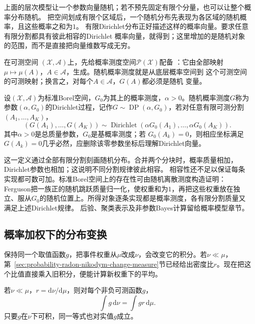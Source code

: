 上面的层次模型让一个参数向量随机；若不预先固定有限个分量，也可以让整个概率分布随机。
把空间划成有限个区域后，一个随机分布先表现为各区域的随机概率，且这些概率之和为$1$。
有限Dirichlet分布正好描述这样的概率向量。要求任意有限分割都具有彼此相容的Dirichlet
概率向量，就得到；这里增加的是随机对象的范围，而不是直接把向量维数写成无穷。
\begin{definition}[随机概率测度]
  \label{def:probability-random-probability-measure}
在可测空间
\((\mathcal X,\mathcal A)\)上，先给概率测度空间\(\mathcal P(\mathcal X)\)配备
：它由全部映射
\(\mu\mapsto\mu(A)\)，\(A\in\mathcal A\)，生成。随机概率测度就是从底层概率空间到
这个可测空间的可测映射；换言之，对每个\(A\in\mathcal A\)，\(G(A)\)都必须是随机
变量。
\end{definition}
\begin{definition}[Dirichlet过程]
  \label{def:probability-dirichlet-process}
  设\((\mathcal X,\mathcal A)\)为标准Borel空间，\(G_0\)为其上的概率测度，\(\alpha>0\)。随机概率测度\(G\)称为参数\((\alpha,G_0)\)的Dirichlet过程，记作\(G\sim\operatorname{DP}(\alpha,G_0)\)，若对任意有限可测分割
\((A_1,\ldots,A_K)\)，
\[ (G(A_1),\ldots,G(A_K))
  \sim\operatorname{Dirichlet}(\alpha G_0(A_1),\ldots,\alpha G_0(A_K)). \]
其中\(\alpha>0\)是总质量参数，\(G_0\)是基概率测度；若
\(G_0(A_k)=0\)，则相应坐标满足\(G(A_k)=0\)几乎必然，应删除该零参数坐标后理解Dirichlet向量。
\end{definition}
这一定义通过全部有限分割刻画随机分布。合并两个分块时，概率质量相加，Dirichlet参数也相加；这说明不同分割规律彼此相容。
相容性还不足以保证每条实现都可数可加。标准Borel空间上的存在性可由随机离散测度构造证明：Ferguson把一族正的随机跳跃质量归一化，使权重和为\(1\)，再把这些权重放在独立、服从\(G_0\)的随机位置上。所得对象逐条实现都是概率测度，各有限分割质量又满足上述Dirichlet规律。
后验、聚类表示及非参数Bayes计算留给概率模型章节。

\subsection{概率加权下的分布变换}

保持同一个取值函数\(g\)，把事件权重从\(\mu\)改成\(\nu\)，会改变它的积分。若\(\nu\ll\mu\)，第~\ref{sec:probability-radon-nikodym-change-measure}节已经给出密度比\(r\)。现在把这个比值直接乘入旧积分，便能计算新权重下的平均。
\label{sec:rv-change-measure}
\begin{theorem}[换测度积分公式]
\label{thm:probability-change-measure-integral}
若\(\nu\ll\mu\)，\(r=\mathrm{d}\nu/\mathrm{d}\mu\)，则对每个非负可测函数\(g\)，
\[ \int g\,\mathrm{d}\nu
  =\int gr\,\mathrm{d}\mu. \]
只要\(g\)在\(\nu\)下可积，同一等式也对实值\(g\)成立。
\end{theorem}

